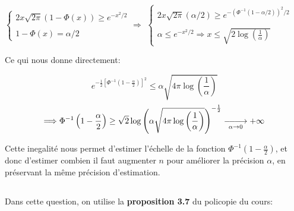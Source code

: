 \documentclass{article}
\def\longlongrightarrow{\relbar\joinrel\relbar\joinrel\relbar\joinrel\rightarrow}
\begin{document}
$ \left\{
\begin{array}{ll}
\displaystyle 2x\sqrt{2\pi}(1-\Phi(x))\geq e^{-x^2/2} \\ \\
\displaystyle 1-\Phi(x) = \alpha/2
\end{array}
\right.
\Longrightarrow
$
$ \left\{
\begin{array}{ll}
\displaystyle 2x\sqrt{2\pi}(\alpha/2)\geq e^{-{(\Phi^{-1}(1-\alpha/2))}^2/2} \\ \\
\displaystyle \alpha \leq e^{-x^2/2} \Rightarrow x \leq \sqrt{2\log\left(\frac{1}{\alpha}\right)}
\end{array}
\right.
$


Ce qui nous donne directement:

$$e^{-\frac{1}{2}\left[\Phi^{-1}\left(1-\frac{\alpha}{2}\right)\right]^2} \leq \alpha\sqrt{4\pi\log\left(\frac{1}{\alpha}\right)}$$
$$\Longrightarrow \Phi^{-1}\left(1-\frac{\alpha}{2}\right) \geq \sqrt{2} \log\left(\alpha\sqrt{4\pi\log\left(\frac{1}{\alpha}\right)}\right)^{-\frac{1}{2}} \underset{\alpha \rightarrow 0}{\longlongrightarrow} +\infty$$

Cette inegalité nous permet d'estimer l'échelle de la fonction $\Phi^{-1}\left(1-\frac{\alpha}{2}\right)$, et donc d'estimer combien il faut augmenter $n$ pour améliorer la précision $\alpha$, en préservant la même précision d'estimation.

\subsection{}
Dans cette question, on utilise la \textbf{proposition 3.7} du policopie du cours:
\vspace{0.2in}
\end{document}
